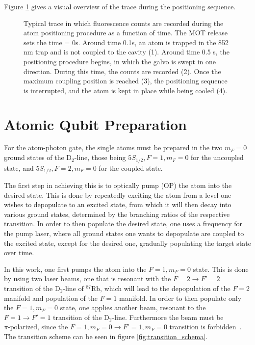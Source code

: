 Figure \ref{fig:atom_loading} gives a visual overview of the trace during the positioning sequence.

\begin{figure}[htpb]
	\centering
	
	\caption{Typical trace in which fluorescence counts are recorded during the atom positioning procedure as a function of time. The MOT release sets the time = 0s. Around time 0.1s, an atom is trapped in the 852 nm trap and is not coupled to the cavity (1). Around time 0.5 s, the positioning procedure begins, in which the galvo is swept in one direction. During this time, the counts are recorded (2). Once the maximum coupling position is reached (3), the positioning sequence is interrupted, and the atom is kept in place while being cooled (4).}
	\label{fig:atom_loading}
\end{figure}

\section{Atomic Qubit Preparation} \label{sec:atomic_qubit_preparation}

For the atom-photon gate, the single atoms must be prepared in the two $m_F=0$ ground states of the $\text{D}_2\text{-line}$, those being $5 S_{1/2}, F=1, m_F = 0$ for the uncoupled state, and $5 S_{1/2}, F=2, m_F = 0$ for the coupled state.

The first step in achieving this is to optically pump (OP) the atom into the desired state. This is done by repeatedly exciting the atom from a level one wishes to depopulate to an excited state, from which it will then decay into various ground states, determined by the branching ratios of the respective transition. In order to then populate the desired state, one uses a frequency for the pump laser, where all ground states one wants to depopulate are coupled to the excited state, except for the desired one, gradually populating the target state over time.

In this work, one first pumps the atom into the $F=1, m_F = 0$ state. This is done by using two laser beams, one that is resonant with the $F=2\rightarrow F'=2$ transition of the $\text{D}_2\text{-line}$ of $^{87}\text{Rb}$, which will lead to the depopulation of the $F=2$ manifold and population of the $F=1$ manifold. In order to then populate only the $F=1, m_F=0$ state, one applies another beam, resonant to the $F=1\rightarrow F'=1$ transition of the $\text{D}_2\text{-line}$. Furthermore the beam must be $\pi\text{-polarized}$, since the $F=1,m_F=0 \rightarrow F'=1,m_F=0$ transition is forbidden~\cite{SteckRb87}. The transition scheme can be seen in figure \ref{fig:transition_schema}.

